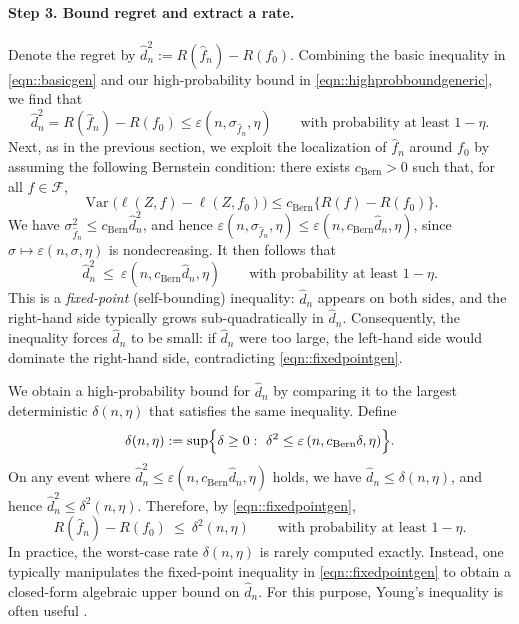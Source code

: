 \documentclass[11pt]{article}
\theoremstyle{plain}
\theoremstyle{definition} %
\newcommand{\Var}{\operatorname{Var}}
\begin{document}
 \noindent \paragraph{Step 3. Bound regret and extract a rate.} Denote the regret by \(\hat d_n^2 := R(\hat f_n)-R(f_0)\). Combining the basic inequality in \eqref{eqn::basicgen} and our high-probability bound in \eqref{eqn::highprobboundgeneric}, we find that
\[
\hat d_n^2  = R(\hat f_n)-R(f_0)  \le \varepsilon (n,\sigma_{\hat f_n},\eta)
\qquad\text{with probability at least }1-\eta.
\] 
Next, as in  the previous section, we exploit the localization of \(\hat f_n\) around \(f_0\) by assuming the following Bernstein condition: there exists \(c_{\mathrm{Bern}}>0\) such that, for all \(f\in\mathcal F\),
\begin{equation*}
\Var\bigl(\ell(Z,f)-\ell(Z,f_0)\bigr)\le c_{\mathrm{Bern}}\{R(f)-R(f_0)\}.
\end{equation*}
We have \(\sigma_{\hat f_n}^2 \le c_{\mathrm{Bern}} \hat{d}_n^2\), and hence
\(\varepsilon(n,\sigma_{\hat f_n},\eta) \le \varepsilon(n, c_{\mathrm{Bern}} \hat{d}_n,\eta)\), since
\(\sigma \mapsto \varepsilon(n,\sigma,\eta)\) is nondecreasing.
It then follows that
\begin{equation}
\label{eqn::fixedpointgen}
\hat d_n^2 \ \le\ \varepsilon(n, c_{\mathrm{Bern}}\hat d_n,\eta)
\qquad\text{with probability at least }1-\eta.
\end{equation}
This is a \emph{fixed-point} (self-bounding) inequality: \(\hat d_n\) appears on
both sides, and the right-hand side typically grows sub-quadratically in
\(\hat d_n\). Consequently, the inequality forces \(\hat d_n\) to be small: if
\(\hat d_n\) were too large, the left-hand side would dominate the right-hand
side, contradicting \eqref{eqn::fixedpointgen}.

We obtain a high-probability bound for \(\hat d_n\) by comparing it to the
largest deterministic \(\delta(n,\eta)\) that satisfies the same inequality.
Define
\[
\delta(n,\eta)
:=
\sup\Bigl\{\delta\ge 0:\ \delta^2 \le \varepsilon\left(n, c_{\mathrm{Bern}} \delta,\eta\right)\Bigr\}.
\]
On any event where \(\hat d_n^2 \le \varepsilon(n, c_{\mathrm{Bern}}\hat d_n,\eta)\) holds, we
have \(\hat d_n \le \delta(n,\eta)\), and hence \(\hat d_n^2 \le \delta^2(n,\eta)\).
Therefore, by \eqref{eqn::fixedpointgen},
\[
R(\hat f_n)-R(f_0) \ \le\ \delta^2(n,\eta)
\qquad\text{with probability at least }1-\eta.
\]
In practice, the worst-case rate \(\delta(n,\eta)\) is rarely computed exactly.
Instead, one typically manipulates the fixed-point inequality in
\eqref{eqn::fixedpointgen} to obtain a closed-form algebraic upper bound on
\(\hat d_n\). For this purpose, Young's inequality is often useful
\citep{hardy1952inequalities}.
\end{document}

